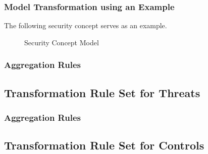 \subsubsection{Model Transformation using an Example}

The following security concept serves as an example. 

\begin{figure}[p]
    \vspace*{-2cm}
    \caption{Security Concept Model}
\end{figure}

\subsubsection{Aggregation Rules}
\subsection{Transformation Rule Set for Threats}
\label{subsec:threat_rules}
\subsubsection{Aggregation Rules}
\subsection{Transformation Rule Set for Controls}
